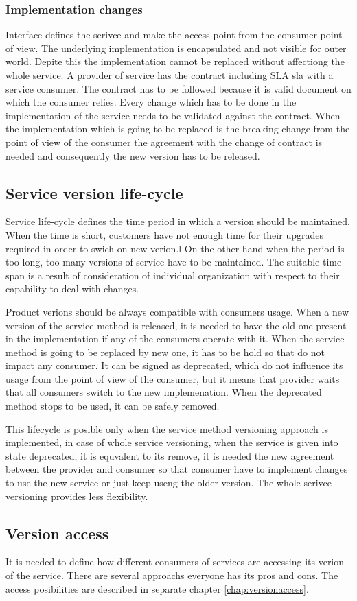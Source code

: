 \subsubsection{Implementation changes}
Interface defines the serivce and make the access point from the consumer point of view. The underlying implementation is encapsulated and not visible for outer world. Depite this the implementation cannot be replaced without affectiong the whole service. A provider of service has the contract including SLA \gls{sla} with a service consumer. The contract has to be followed because it is valid document on which the consumer relies. 
Every change which has to be done in the implementation of the service needs to be validated against the contract. When the implementation which is going to be replaced is the breaking change from the point of view of the consumer the agreement with the change of contract is needed and consequently the new version has to be released.

\subsection{Service version life-cycle}
Service life-cycle defines the time period in which a version should be maintained. When the time is short, customers have not enough time for their upgrades required in order to swich on new verion.l On the other hand when the period is too long, too many versions of service have to be maintained. The suitable time span is a result of consideration of individual organization with respect to their capability to deal with changes.

Product verions should be always compatible with consumers usage. When a new version of the service method is released, it is needed to have the old one present in the implementation if any of the consumers operate with it. When the service method is going to be replaced by new one, it has to be hold so that do not impact any consumer. It can be signed as deprecated, which do not influence its usage from the point of view of the consumer, but it means that provider waits that all consumers switch to the new implemenation. When the deprecated method stops to be used, it can be safely removed. 

This lifecycle is posible only when the service method versioning approach is implemented, in case of whole service versioning, when the service is given into state deprecated, it is equvalent to its remove, it is needed the new agreement between the provider and consumer so that consumer have to implement changes to use the new service or just  keep useng the older version. The whole serivce versioning provides less flexibility.

\subsection{Version access}
It is needed to define how different consumers of services are accessing its verion of the service. There are several approachs everyone has its pros and cons. The access posibilities are described in separate chapter \ref{chap:versionaccess}.
